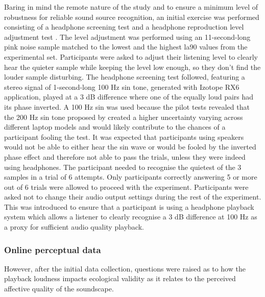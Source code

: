    Baring in mind the remote nature of the study and to ensure a minimum level of robustness for reliable sound source recognition, an initial exercise was performed consisting of a headphone screening test \citep{Woods2017Headphone} and a headphone reproduction level adjustment test \citep{Gontier2019Estimation}. The level adjustment was performed using an 11-second-long pink noise sample matched to the lowest and the highest \gls{la90} values from the experimental set. Participants were asked to adjust their listening level to clearly hear the quieter sample while keeping the level low enough, so they don't find the louder sample disturbing. The headphone screening test followed, featuring a stereo signal of 1-second-long 100 Hz sin tone, generated with Izotope RX6 application, played at a 3 dB difference where one of the equally loud pairs had its phase inverted. A 100 Hz sin was used because the pilot tests revealed that the 200 Hz sin tone proposed by \citet{Woods2017Headphone} created a higher uncertainty varying across different laptop models and would likely contribute to the chances of a participant fooling the test. It was expected that participants using speakers would not be able to either hear the sin wave or would be fooled by the inverted phase effect and therefore not able to pass the trials, unless they were indeed using headphones. The participant needed to recognise the quietest of the 3 samples in a trial of 6 attempts. Only participants correctly answering 5 or more out of 6 trials were allowed to proceed with the experiment. Participants were asked not to change their audio output settings during the rest of the experiment. This was introduced to ensure that a participant is using a headphone playback system which allows a listener to clearly recognise a 3 dB difference at 100 Hz as a proxy for sufficient audio quality playback.

   \subsubsection*{Online perceptual data}
   \label{sec:onlinePerceptualData}

   However, after the initial data collection, questions were raised as to how the playback loudness impacts ecological validity as it relates to the perceived affective quality of the soundscape.  

